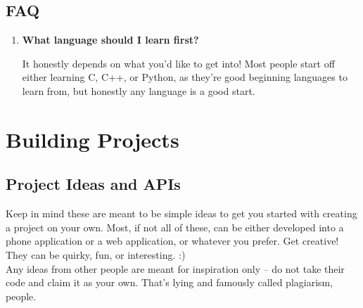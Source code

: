 \documentclass{article}
\begin{document}
\subsection{FAQ}
\begin{enumerate}
    \item \textbf{What language should I learn first?}
    \begin{itemize}
        It honestly depends on what you'd like to get into! Most people start off either learning C, C++, or Python, as they're good beginning languages to learn from, but honestly any language is a good start. 
    \end{itemize}
\end{enumerate}
\newpage
\section{Building Projects}
\subsection {Project Ideas and APIs}
\label{sec:projects}
\hspace{0.5cm} Keep in mind these are meant to be simple ideas to get you started with creating a project on your own. Most, if not all of these, can be either developed into a phone application or a web application, or whatever you prefer. Get creative! They can be quirky, fun, or interesting. :) \\

Any ideas from other people are meant for inspiration only -- do not take their code and claim it as your own. That's lying and famously called plagiarism, people. 
\end{document}
